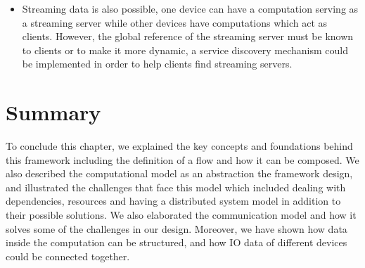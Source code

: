 \begin{itemize}
	\item Streaming data is also possible, one device can have a computation serving as a streaming server while other devices have computations which act as clients. However, the global reference of the streaming server must be known to clients or to make it more dynamic, a service discovery mechanism could be implemented in order to help clients find streaming servers.
\end{itemize}	


\section{Summary}

To conclude this chapter, we explained the key concepts and foundations behind this framework including the definition of a flow and how it can be composed. We also described the computational model as an abstraction the framework design, and illustrated the challenges that face this model which included  dealing with dependencies, resources and having a distributed system model in addition to their possible solutions. We also elaborated the communication model and how it solves some of the challenges in our design. Moreover, we have shown how data inside the computation can be structured, and how IO data of different devices could be connected together.


